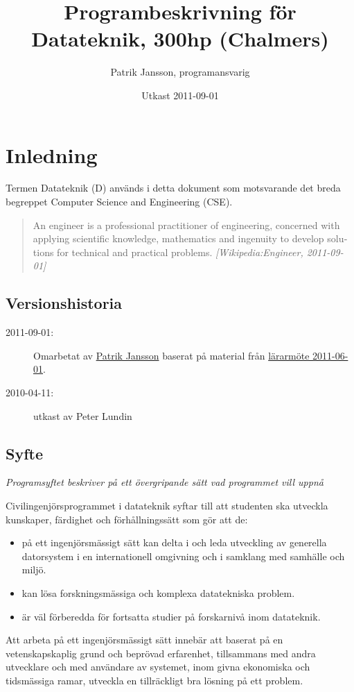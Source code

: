 \documentclass[twocolumn]{article}
\title{Programbeskrivning för Datateknik, 300hp (Chalmers)}
\author{Patrik Jansson, programansvarig}
\date{Utkast 2011-09-01}
\newcommand{\meta}[1]{{\small \emph{#1}}}
\begin{document}
\maketitle
\section{Inledning}

Termen Datateknik (D) används i detta dokument som motsvarande det
breda begreppet \foreignlanguage{english}{Computer Science and
  Engineering (CSE)}.

\begin{quote}
  \foreignlanguage{english}{An engineer is a professional practitioner
    of engineering, concerned with applying scientific knowledge,
    mathematics and ingenuity to develop solutions for technical and
    practical problems. \meta{[Wikipedia:Engineer, 2011-09-01]}}
\end{quote}

\subsection*{Versionshistoria}
{\small
\begin{description}
\item[2011-09-01:] Omarbetat av \href{http://www.chalmers.se/cse/EN/people/jansson-patrik}{Patrik Jansson} baserat på material från 
\href{http://wiki.portal.chalmers.se/cse/pmwiki.php/PAD/L%C3%A4rarm%C3%B6teVT2011}{lärarmöte 2011-06-01}.
\item[2010-04-11:] utkast av Peter Lundin
\end{description}
}

\subsection{Syfte} 
\meta{Programsyftet beskriver på ett övergripande sätt vad programmet vill
uppnå}

Civilingenjörsprogrammet i datateknik syftar till att studenten ska
utveckla kunskaper, färdighet och förhållningssätt som gör att de:
\begin{itemize}
\item på ett ingenjörsmässigt sätt kan delta i och leda utveckling av
  generella datorsystem i en internationell omgivning och i samklang
  med samhälle och miljö.
\item kan lösa forskningsmässiga och komplexa datatekniska problem.
\item är väl förberedda för fortsatta studier på forskarnivå inom
  datateknik.
\end{itemize}
Att arbeta på ett ingenjörsmässigt sätt innebär att
baserat på en vetenskapskaplig grund och beprövad erfarenhet,
tillsammans med andra utvecklare och med användare av systemet,
inom givna ekonomiska och tidsmässiga ramar,
utveckla en tillräckligt bra lösning på ett problem.
\end{document}
